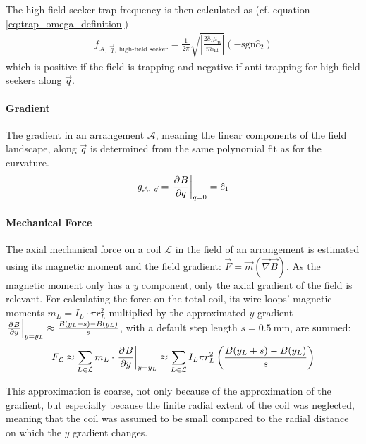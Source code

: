 The high-field seeker trap frequency is then calculated as (cf. equation \ref{eq:trap_omega_definition})
\begin{align}\label{eq:trap_frequency_simulation}
    f_{\mathcal{A},~\vec q,~\text{high-field seeker}} = \frac{1}{2\pi}  \sqrt{\left| \frac{2 \hat c_2 \mu_\text{B}}{m_{^6\text{Li}}} \right|} (-\mathrm{sgn} \hat c_2)
\end{align}
which is positive if the field is trapping and negative if anti-trapping for high-field seekers along $\vec q$.

\paragraph{Gradient}
The gradient in an arrangement $\mathcal{A}$, meaning the linear components of the field landscape, along $\vec q$ is determined from the same polynomial fit as for the curvature.
\begin{align}\label{eq:gradient_simulation}
    g_{\mathcal{A},~\vec q} = \eval{\pdv[]{B}{q}}_{q = 0} = \hat c_1
\end{align}

\paragraph{Mechanical Force}
The axial mechanical force on a coil $\mathcal{L}$ in the field of an arrangement is estimated using its magnetic moment and the field gradient: $\vec F = \vec m (\vec \nabla \vec B)$. As the magnetic moment only has a $y$ component, only the axial gradient of the field is relevant. For calculating the force on the total coil, its wire loops' magnetic moments $m_L = I_L \cdot \pi r_L^2$ multiplied by the approximated $y$ gradient $\eval{\pdv[]{B}{y}}_{y = y_L} \approx \frac{B(y_L + s) - B(y_L)}{s}$, with a default step length $s = \SI{0.5}{\milli\meter}$, are summed:
\begin{align}\label{eq:mechanical_force_simulation}
    F_\mathcal{L} \approx \sum\limits_{L \in \mathcal L} m_L \cdot \eval{\pdv[]{B}{y}}_{y = y_L} \approx \sum\limits_{L \in \mathcal L} I_L \pi r_L^2 \left(\frac{B(y_L + s)-B(y_L)}{s}\right)
\end{align}

This approximation is coarse, not only because of the approximation of the gradient, but especially because the finite radial extent of the coil was neglected, meaning that the coil was assumed to be small compared to the radial distance on which the $y$ gradient changes.




